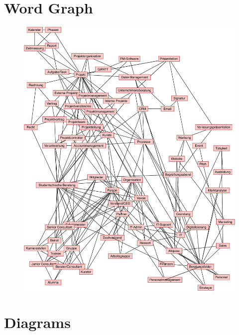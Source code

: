 \documentclass[a4paper, DIV=13, BCOR=0cm]{scrbook}
\begin{document}
\section{Word Graph}
\label{word-graph}
\begin{figure}[h!]
	\centering
	\includegraphics[height=0.9\textheight, width=1\textwidth]{Diagrams/word-graph.pdf}
\end{figure}
\clearpage

\section{Diagrams}
\end{document}
